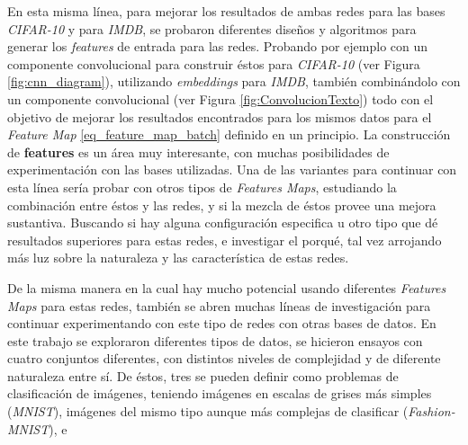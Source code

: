 \documentclass[spanish]{article}
\theoremstyle{definition}
\theoremstyle{remark}
\numberwithin{equation}{section}
\numberwithin{equation}{section} %
\begin{document}
\par
En esta misma línea, para mejorar los resultados de ambas redes para las bases \textit{CIFAR-10} y para \textit{IMDB}, se probaron diferentes diseños y algoritmos para generar los \textit{features} de entrada para las redes. Probando por ejemplo con un componente convolucional para construir éstos para \textit{CIFAR-10} (ver Figura \ref{fig:cnn_diagram}), utilizando \textit{embeddings} para \textit{IMDB}, también combinándolo con un componente convolucional (ver Figura \ref{fig:ConvolucionTexto}) todo con el objetivo de mejorar los resultados encontrados para los mismos datos para el \textit{Feature Map} \eqref{eq_feature_map_batch} definido en un principio. La construcción de \textbf{features} es un área muy interesante, con muchas posibilidades de experimentación con las bases utilizadas. Una de las variantes para continuar con esta línea sería probar con otros tipos de \textit{Features Maps}, estudiando la combinación entre éstos y las redes, y si la mezcla de éstos provee una mejora sustantiva. Buscando si hay alguna configuración especifica u otro tipo que dé resultados superiores para estas redes, e investigar el porqué, tal vez arrojando más luz sobre la naturaleza y las característica de estas redes.  
\par
De la misma manera en la cual hay mucho potencial usando diferentes \textit{Features Maps} para estas redes, también se abren muchas líneas de investigación para continuar experimentando con este tipo de redes con otras bases de datos. En este trabajo se exploraron diferentes tipos de datos, se hicieron ensayos con cuatro conjuntos diferentes, con distintos niveles de complejidad y de diferente naturaleza entre sí. De éstos, tres se pueden definir como problemas de clasificación de imágenes, teniendo imágenes en escalas de grises más simples (\textit{MNIST}), imágenes del mismo tipo aunque más complejas de clasificar (\textit{Fashion-MNIST}), e 
\end{document}

